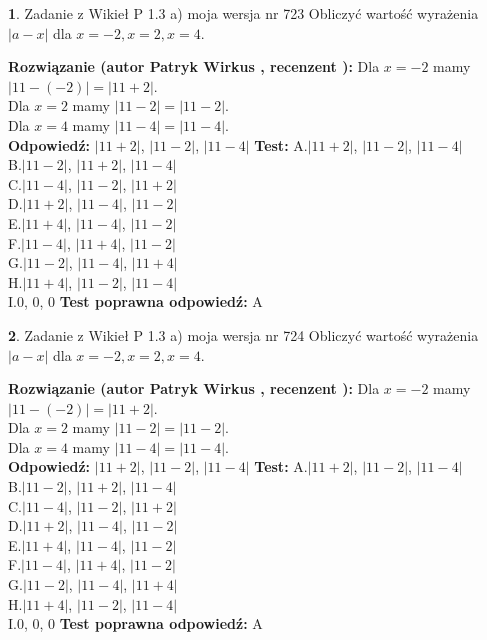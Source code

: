 \documentclass[12pt, a4paper]{article}
\theoremstyle{definition} %
\newtheorem{zad}{}
\newcommand{\zadStart}[1]{\begin{zad}#1\newline}
\newcommand{\zadStop}{\end{zad}}
\newcommand{\rozwStart}[2]{\noindent \textbf{Rozwiązanie (autor #1 , recenzent #2): }\newline}
\newcommand{\rozwStop}{\newline}
\newcommand{\odpStart}{\noindent \textbf{Odpowiedź:}\newline}
\newcommand{\odpStop}{\newline}
\newcommand{\testStart}{\noindent \textbf{Test:}\newline}
\newcommand{\testStop}{\newline}
\newcommand{\kluczStart}{\noindent \textbf{Test poprawna odpowiedź:}\newline}
\newcommand{\kluczStop}{\newline}
\begin{document}
\zadStart{Zadanie z Wikieł P 1.3 a) moja wersja nr 723}
Obliczyć wartość wyrażenia $|a - x|$ dla $x=-2,x=2,x=4$.
\zadStop
\rozwStart{Patryk Wirkus}{}
Dla $x = -2$ mamy $|11 - (-2)| = |11 + 2|$.\\
Dla $x = 2$ mamy $|11 - 2| = |11 - 2|$.\\
Dla $x = 4$ mamy $|11 - 4| = |11 - 4|$.\\
\rozwStop
\odpStart
$|11 + 2|$, $|11 - 2|$, $|11 - 4|$
\odpStop
\testStart
A.$|11 + 2|$, $|11 - 2|$, $|11 - 4|$\\
B.$|11 - 2|$, $|11 + 2|$, $|11 - 4|$\\
C.$|11 - 4|$, $|11 - 2|$, $|11 + 2|$\\
D.$|11 + 2|$, $|11 - 4|$, $|11 - 2|$\\
E.$|11 + 4|$, $|11 - 4|$, $|11 - 2|$\\
F.$|11 - 4|$, $|11 + 4|$, $|11 - 2|$\\
G.$|11 - 2|$, $|11 - 4|$, $|11 + 4|$\\
H.$|11 + 4|$, $|11 - 2|$, $|11 - 4|$\\
I.$0$, $0$, $0$
\testStop
\kluczStart
A
\kluczStop



\zadStart{Zadanie z Wikieł P 1.3 a) moja wersja nr 724}
Obliczyć wartość wyrażenia $|a - x|$ dla $x=-2,x=2,x=4$.
\zadStop
\rozwStart{Patryk Wirkus}{}
Dla $x = -2$ mamy $|11 - (-2)| = |11 + 2|$.\\
Dla $x = 2$ mamy $|11 - 2| = |11 - 2|$.\\
Dla $x = 4$ mamy $|11 - 4| = |11 - 4|$.\\
\rozwStop
\odpStart
$|11 + 2|$, $|11 - 2|$, $|11 - 4|$
\odpStop
\testStart
A.$|11 + 2|$, $|11 - 2|$, $|11 - 4|$\\
B.$|11 - 2|$, $|11 + 2|$, $|11 - 4|$\\
C.$|11 - 4|$, $|11 - 2|$, $|11 + 2|$\\
D.$|11 + 2|$, $|11 - 4|$, $|11 - 2|$\\
E.$|11 + 4|$, $|11 - 4|$, $|11 - 2|$\\
F.$|11 - 4|$, $|11 + 4|$, $|11 - 2|$\\
G.$|11 - 2|$, $|11 - 4|$, $|11 + 4|$\\
H.$|11 + 4|$, $|11 - 2|$, $|11 - 4|$\\
I.$0$, $0$, $0$
\testStop
\kluczStart
A
\kluczStop
\end{document}
